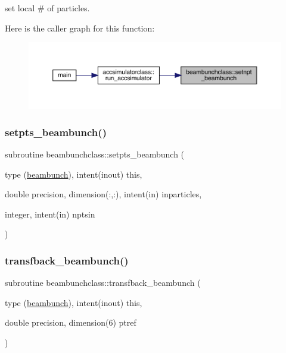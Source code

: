 set local \# of particles. 

Here is the caller graph for this function\+:\nopagebreak
\begin{figure}[H]
\begin{center}
\leavevmode
\includegraphics[width=350pt]{namespacebeambunchclass_af1b14b706bd1283ff6c5a7cec4b06c48_icgraph}
\end{center}
\end{figure}
\mbox{\label{namespacebeambunchclass_a2cf9a1a04b69a4b2509d80522112a3bd}} 
\subsubsection{\texorpdfstring{setpts\_beambunch()}{setpts\_beambunch()}}
{\footnotesize\ttfamily subroutine beambunchclass\+::setpts\+\_\+beambunch (\begin{DoxyParamCaption}\item[{type (\mbox{\hyperlink{namespacebeambunchclass_structbeambunchclass_1_1beambunch}{beambunch}}), intent(inout)}]{this,  }\item[{double precision, dimension(\+:,\+:), intent(in)}]{inparticles,  }\item[{integer, intent(in)}]{nptsin }\end{DoxyParamCaption})}

\mbox{\label{namespacebeambunchclass_a89d32b2a56cd1eb84867e95897af307a}} 
\subsubsection{\texorpdfstring{transfback\_beambunch()}{transfback\_beambunch()}}
{\footnotesize\ttfamily subroutine beambunchclass\+::transfback\+\_\+beambunch (\begin{DoxyParamCaption}\item[{type (\mbox{\hyperlink{namespacebeambunchclass_structbeambunchclass_1_1beambunch}{beambunch}}), intent(inout)}]{this,  }\item[{double precision, dimension(6)}]{ptref }\end{DoxyParamCaption})}

